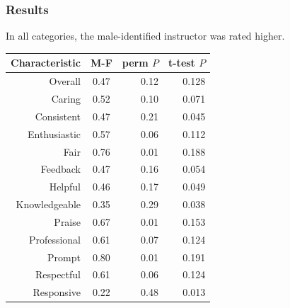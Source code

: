 \documentclass{beamer}
\newcommand{\todo}[1]{{\color{red}{TO DO: \sc #1}}}
\begin{document}
\frame
{
  \frametitle{Results}
  \todo{update p-values}
In all categories, the male-identified instructor was rated higher.
\begin{table}
\begin{tabular}{r|crr}
\textbf{Characteristic} & \textbf{M-F} & \textbf{perm} $P$ & \textbf{t-test} $P$ \\
\hline
Overall & 0.47 & 0.12 & 0.128\\
Caring & 0.52 & 0.10 & 0.071\\
Consistent & 0.47 & 0.21 & 0.045 \\ %
Enthusiastic & 0.57 & 0.06 & 0.112 \\
Fair & 0.76 & 0.01 & 0.188 \\
Feedback & 0.47 & 0.16 & 0.054 \\
Helpful & 0.46 & 0.17 & 0.049 \\
Knowledgeable & 0.35 & 0.29 & 0.038 \\
Praise & 0.67 & 0.01 & 0.153 \\
Professional & 0.61 & 0.07 & 0.124 \\
Prompt & 0.80 & 0.01 & 0.191 \\
Respectful & 0.61 & 0.06 & 0.124 \\
Responsive & 0.22 & 0.48 & 0.013
\end{tabular}
\end{table}

}



\end{document}
